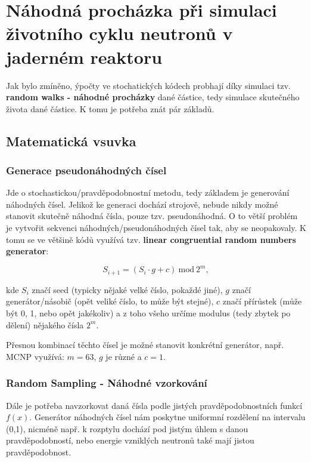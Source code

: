 \section[Náhodná procházka]{Náhodná procházka při simulaci životního cyklu neutronů v jaderném reaktoru}

Jak bylo zmíněno, ýpočty ve stochatických kódech probhají díky simulaci tzv. \textbf{random walks - náhodné procházky} dané částice, tedy simulace skutečného života dané částice. K tomu je potřeba znát pár základů.

\subsection{Matematická vsuvka}

\subsubsection{Generace pseudonáhodných čísel}

Jde o stochastickou/pravděpodobnostní metodu, tedy základem je generování náhodných čísel. Jelikož ke generaci dochází strojově, nebude nikdy možné stanovit skutečně náhodná čísla, pouze tzv. pseudonáhodná. O to větší problém je vytvořit sekvenci náhodných/pseudonáhodných čísel tak, aby se neopakovaly. K tomu se ve většině kódů využívá tzv. \textbf{linear congruential random numbers generator}:

$$ S_{i+1} = ( S_i \cdot g + c ) \: \text{mod} \: 2^m, $$

kde $S_i$ značí seed (typicky nějaké velké číslo, pokaždé jiné), $g$ značí generátor/násobič (opět veliké číslo, to může být stejné), $c$ značí přírůstek (může být 0, 1, nebo opět jakékoliv) a z toho všeho určíme modulus (tedy zbytek po dělení) nějakého čísla $2^m$.

Přesnou kombinací těchto čísel je možné stanovit konkrétní generátor, např. MCNP využívá: $m = 63$, $g$ je různé a $c = 1$.

\subsubsection{Random Sampling - Náhodné vzorkování}

Dále je potřeba navzorkovat daná čísla podle jistých pravděpodobnostních funkcí $f(x)$. Generátor náhodných čísel nám poskytne uniformní rozdělení na intervalu (0,1), nicméně např. k rozptylu dochází pod jistým úhlem s danou pravděpodobností, nebo energie vzniklých neutronů také mají jistou pravděpodobnost.


